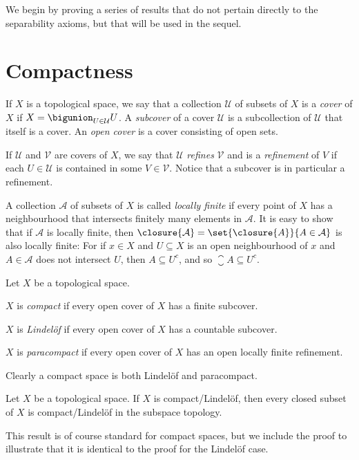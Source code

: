\documentclass[article, a4paper, 11pt, oneside]{memoir}
\numberwithin{equation}{chapter}
\newcommand{\calU}{\mathcal{U}}
\newcommand{\calV}{\mathcal{V}}
\begin{document}
We begin by proving a series of results that do not pertain directly to the separability axioms, but that will be used in the sequel.


\section{Compactness}

\newcommand{\calA}{\mathcal{A}}

If $X$ is a topological space, we say that a collection $\calU$ of subsets of $X$ is a \emph{cover} of $X$ if $X = \bigunion_{U \in \calU} U$. A \emph{subcover} of a cover $\calU$ is a subcollection of $\calU$ that itself is a cover. An \emph{open cover} is a cover consisting of open sets.

If $\calU$ and $\calV$ are covers of $X$, we say that $\calU$ \emph{refines} $\calV$ and is a \emph{refinement} of $V$ if each $U \in \calU$ is contained in some $V \in \calV$. Notice that a subcover is in particular a refinement.

A collection $\calA$ of subsets of $X$ is called \emph{locally finite} if every point of $X$ has a neighbourhood that intersects finitely many elements in $\calA$. It is easy to show that if $\calA$ is locally finite, then $\closure{\calA} = \set{\closure{A}}{A \in \calA}$ is also locally finite: For if $x \in X$ and $U \subseteq X$ is an open neighbourhood of $x$ and $A \in \calA$ does not intersect $U$, then $A \subseteq U^c$, and so $\closure{A} \subseteq U^c$.

\begin{definition}
    Let $X$ be a topological space.
    \begin{enumdef}
        \item $X$ is \emph{compact} if every open cover of $X$ has a finite subcover.

        \item $X$ is \emph{Lindelöf} if every open cover of $X$ has a countable subcover.

        \item $X$ is \emph{paracompact} if every open cover of $X$ has an open locally finite refinement.
    \end{enumdef}
\end{definition}
%
Clearly a compact space is both Lindelöf and paracompact.


\begin{proposition}
    \label{thm:compact-Lindelof-closed-subset}
    Let $X$ be a topological space. If $X$ is compact/Lindelöf, then every closed subset of $X$ is compact/Lindelöf in the subspace topology.
\end{proposition}
%
This result is of course standard for compact spaces, but we include the proof to illustrate that it is identical to the proof for the Lindelöf case.
\end{document}
